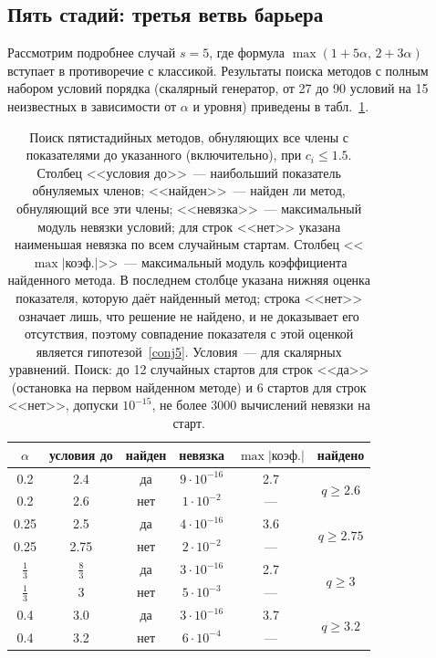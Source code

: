 \documentclass[11pt,a4paper]{article}
\theoremstyle{plain}
\theoremstyle{definition}
\begin{document}
\subsection{Пять стадий: третья ветвь барьера}\label{sec:s5}

Рассмотрим подробнее случай $s=5$, где формула $\max(1+5\alpha,\,2+3\alpha)$ вступает в противоречие с классикой. Результаты поиска методов с полным набором условий порядка (скалярный генератор, от 27 до 90 условий на 15 неизвестных в зависимости от $\alpha$ и уровня) приведены в табл.~\ref{tab:s5}.

\begin{table}[ht]
\centering\small
\caption{Поиск пятистадийных методов, обнуляющих все члены с показателями до указанного (включительно), при $c_i\le1.5$. Столбец <<условия до>>~--- наибольший показатель обнуляемых членов; <<найден>>~--- найден ли метод, обнуляющий все эти члены; <<невязка>>~--- максимальный модуль невязки условий; для строк <<нет>> указана наименьшая невязка по всем случайным стартам. Столбец <<$\max|\text{коэф.}|$>>~--- максимальный модуль коэффициента найденного метода. В последнем столбце указана нижняя оценка показателя, которую даёт найденный метод; строка <<нет>> означает лишь, что решение не найдено, и не доказывает его отсутствия, поэтому совпадение показателя с этой оценкой является гипотезой~\ref{conj5}. Условия~--- для скалярных уравнений.  Поиск: до 12 случайных стартов для строк <<да>> (остановка на первом найденном методе) и 6 стартов для строк <<нет>>, допуски $10^{-15}$, не более 3000 вычислений невязки на старт.}\label{tab:s5}
\begin{tabular}{cccccc}
\toprule
$\alpha$ & условия до & найден & невязка & $\max|\text{коэф.}|$ & найдено\\
\midrule
0.2 & 2.4 & да & $9\cdot10^{-16}$ & 2.7 & \multirow{2}{*}{$q\ge2.6$}\\
0.2 & 2.6 & нет & $1\cdot10^{-2}$ & --- & \\
0.25 & 2.5 & да & $4\cdot10^{-16}$ & 3.6 & \multirow{2}{*}{$q\ge2.75$}\\
0.25 & 2.75 & нет & $2\cdot10^{-2}$ & --- & \\
$\frac13$ & $\frac83$ & да & $3\cdot10^{-16}$ & 2.7 & \multirow{2}{*}{$q\ge3$}\\
$\frac13$ & 3 & нет & $5\cdot10^{-3}$ & --- & \\
0.4 & 3.0 & да & $3\cdot10^{-16}$ & 3.7 & \multirow{2}{*}{$q\ge3.2$}\\
0.4 & 3.2 & нет & $6\cdot10^{-4}$ & --- & \\

\end{tabular}
\end{table}
\end{document}
